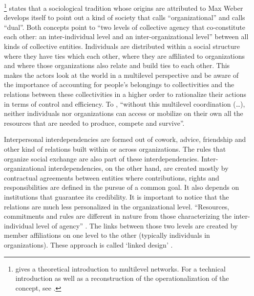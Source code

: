 \documentclass[a4paper, 12pt, openright, oneside, german, french, brazil, english]{abntex2}
\begin{document}
        \footnote{ gives a theoretical introduction to multilevel networks. For a technical introduction as well as a reconstruction of the operationalization of the concept, see .} states that a sociological tradition whose  origins are attributed to Max Weber develops itself to point out a kind of society that  calls ``organizational'' and  calls ``dual''. Both concepts point to ``two levels of collective agency that co-constitute each other: an inter-individual level and an inter-organizational level'' \cite[p. 48]{lazega2016synchronization} between all kinds of collective entities. Individuals are distributed within a social structure where they have ties which each other, where they are affiliated to organizations and where those organizations also relate and build ties to each other. This makes the actors look at the world in a multilevel perspective and be aware of the importance of accounting for people's belongings to collectivities and the relations between these collectivities in a higher order to rationalize their actions in terms of control and efficiency. To , ``without this multilevel coordination (\dots), neither individuals nor organizations can access or mobilize on their own all the resources that are needed to produce, compete and survive''.

        Interpersonal interdependencies are formed out of cowork, advice, friendship and other kind of relations built within or across organizations. The rules that organize social exchange are also part of these interdependencies. Inter-organizational interdependencies, on the other hand, are created mostly by contractual agreements between entities where contributions, rights and responsibilities are defined in the pursue of a common goal. It also depends on institutions that guarantee its credibility. It is important to notice that the relations are much less personalized in the organizational level. ``Resources, commitments and rules are different in nature from those characterizing the inter-individual level of agency'' \cite[p. 49]{lazega2016synchronization}. The links between those two levels are created by member affiliations on one level to the other (typically individuals in organizations). These approach is called `linked design' \cite{lazega2008catching}. 
\end{document}
